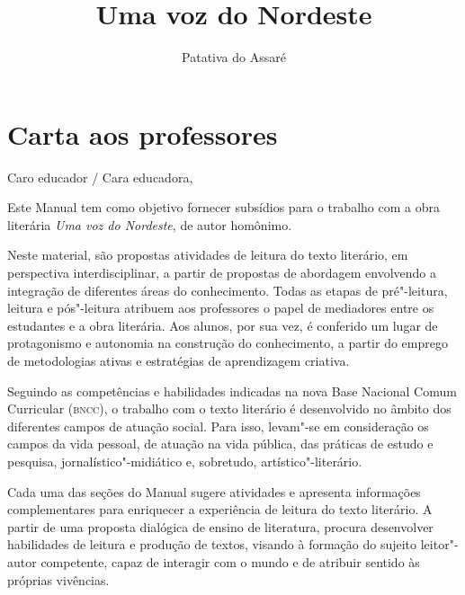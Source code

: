 \documentclass[12pt]{extarticle}
\begin{document}
\newcommand{\AutorLivro}{Patativa do Assaré}
\newcommand{\TituloLivro}{Uma voz do Nordeste}
\newcommand{\Tema}{Ficção, mistério e fantasia}
\newcommand{\Genero}{Poema}
\newcommand{\issnppub}{---}
\newcommand{\issnepub}{---}
\newcommand{\colaborador}{\textbf{Mariana Barrile, Bruno Gradella e Vicente Castro} é uma pessoa incrível e vai fazer um bom serviço.}


\title{\TituloLivro}
\author{\AutorLivro}
\def\authornotes{\colaborador}

\date{}
\maketitle
\tableofcontents

\pagebreak

\section{Carta aos professores}

Caro educador / Cara educadora,\\\bigskip

Este Manual tem como objetivo fornecer subsídios para o trabalho com a
obra literária \emph{Uma voz do Nordeste}, de autor homônimo.

Neste material, são propostas atividades de leitura do texto literário,
em perspectiva interdisciplinar, a partir de propostas de abordagem
envolvendo a integração de diferentes áreas do conhecimento. Todas as
etapas de pré"-leitura, leitura e pós"-leitura atribuem aos professores o
papel de mediadores entre os estudantes e a obra literária. Aos alunos,
por sua vez, é conferido um lugar de protagonismo e autonomia na
construção do conhecimento, a partir do emprego de metodologias ativas e
estratégias de aprendizagem criativa.

Seguindo as competências e habilidades indicadas na nova Base Nacional
Comum Curricular (\textsc{bncc}), o trabalho com o texto literário é desenvolvido
no âmbito dos diferentes campos de atuação social. Para isso, levam"-se
em consideração os campos da vida pessoal, de atuação na vida pública,
das práticas de estudo e pesquisa, jornalístico"-midiático e, sobretudo,
artístico"-literário.

Cada uma das seções do Manual sugere atividades e apresenta informações
complementares para enriquecer a experiência de leitura do texto
literário. A partir de uma proposta dialógica de ensino de literatura,
procura desenvolver habilidades de leitura e produção de textos, visando
à formação do sujeito leitor"-autor competente, capaz de interagir com o
mundo e de atribuir sentido às próprias vivências.
\end{document}
